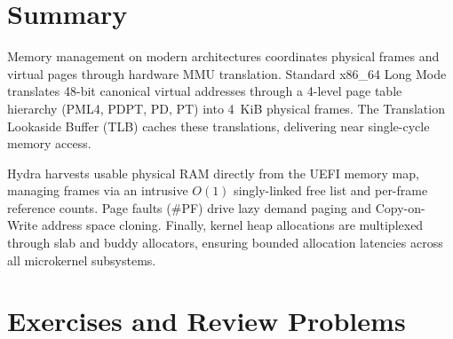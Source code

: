 \section{Summary}
\label{sec:summary_chap3}

Memory management on modern architectures coordinates physical frames and virtual pages through hardware MMU translation. Standard x86\_64 Long Mode translates 48-bit canonical virtual addresses through a 4-level page table hierarchy (PML4, PDPT, PD, PT) into 4~KiB physical frames. The Translation Lookaside Buffer (TLB) caches these translations, delivering near single-cycle memory access.

Hydra harvests usable physical RAM directly from the UEFI memory map, managing frames via an intrusive $O(1)$ singly-linked free list and per-frame reference counts. Page faults (\#PF) drive lazy demand paging and Copy-on-Write address space cloning. Finally, kernel heap allocations are multiplexed through slab and buddy allocators, ensuring bounded allocation latencies across all microkernel subsystems.

\section{Exercises and Review Problems}
\label{sec:exercises_chap3}

